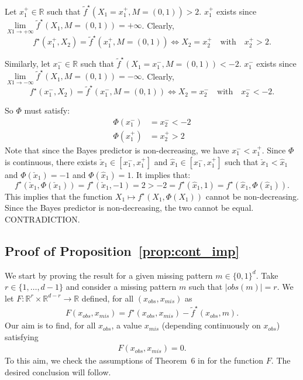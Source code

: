 \documentclass{article}
\newcommand{\RR}{\mathbb{R}}
\newcommand{\sqb}[1]{\left[#1\right]}
\theoremstyle{plain}
\begin{document}
Let $x_1^+ \in \RR$ such that $\tilde f^\star(X_1 = x_1^+, M=(0, 1)) > 2$. $x_1^+$ exists since $\underset{X1 \to +\infty}{\lim} \tilde f^\star(X_1, M=(0, 1)) = +\infty$. Clearly,
$$ f^\star(x_1^+, X_2) = \tilde f^\star(x_1^+, M=(0, 1)) \iff X_2 = x_2^+ \quad \text{with} \quad x_2^+ > 2.$$

Similarly, let $x_1^- \in \RR$ such that $\tilde f^\star(X_1 = x_1^-, M=(0, 1)) < -2$. $x_1^-$ exists since $\underset{X1 \to -\infty}{\lim} \tilde f^\star(X_1, M=(0, 1)) = -\infty$. Clearly,
$$ f^\star(x_1^-, X_2) = \tilde f^\star(x_1^-, M=(0, 1)) \iff X_2 = x_2^- \quad \text{with} \quad x_2^- < -2.$$

So $\Phi$ must satisfy:
\begin{align*}
    \Phi(x_1^-) &= x_2^- < -2\\
    \Phi(x_1^+) &= x_2^+ > 2
\end{align*}
Note that since the Bayes predictor is non-decreasing, we have $x_1^- < x_1^+$. Since $\Phi$ is continuous, there exists $\check x_1 \in \sqb{x_1^-, x_1^+}$ and $\hat x_1 \in \sqb{x_1^-, x_1^+}$ such that $\check x_1 < \hat x_1$
and $\Phi(\check x_1) = -1$ and $\Phi(\hat x_1) = 1$. It implies that:
$$ f^\star(\check x_1, \Phi(\check x_1)) = f^\star(\check x_1, -1) = 2 > -2 = f^\star(\hat x_1, 1) = f^\star(\hat x_1, \Phi(\hat x_1)).$$
This implies that the function $X_1 \mapsto f^\star(X_1, \Phi(X_1))$ cannot be non-decreasing. Since the Bayes predictor is non-decreasing, the two cannot be equal. CONTRADICTION.



\subsection{Proof of Proposition~\ref{prop:cont_imp}}
\label{app:continuous_imputations}

We start by proving the result for a given missing pattern $m \in \{0,1\}^d$. Take $r \in \{1, \hdots, d-1\}$ and consider a missing pattern $m$ such that $|obs(m)| = r$. 
We let $F : \RR^r \times \RR^{d-r} \to \RR$ defined, for all $(x_{obs}, x_{mis})$ as 
\begin{align}
    F(x_{obs}, x_{mis}) = f^{\star} (x_{obs}, x_{mis}) - \tilde{f}^{\star}(x_{obs}, m).
\end{align}
Our aim is to find, for all $x_{obs}$, a value $x_{mis}$ (depending continuously on $x_{obs}$) satisfying
\begin{align}
 F(x_{obs}, x_{mis}) = 0.   
\end{align}
To this aim, we check the assumptions of Theorem~6 in \cite{arutyunov2019application} for the function $F$. The desired conclusion will follow. 
\end{document}
